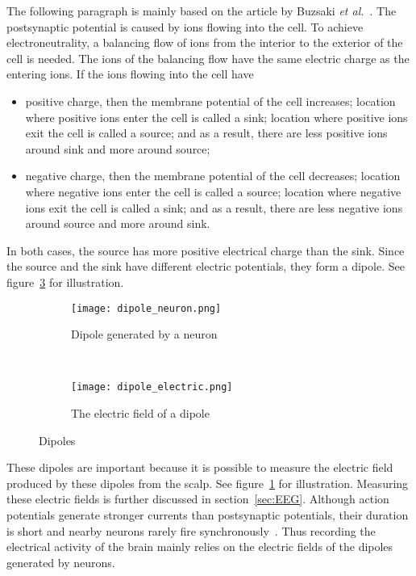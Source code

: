 The following paragraph is mainly based on the article by Buzsaki \textit{et al.}~\cite{electric_field}. The \gls{postsynaptic potential} is caused by ions flowing into the cell. To achieve electroneutrality, a balancing flow of ions from the interior to the exterior of the cell is needed. The ions of the balancing flow have the same electric charge as the entering ions. If the ions flowing into the cell have
\begin{itemize}
	\item positive charge, then 
	\subitem the \gls{membrane potential} of the cell increases;
	\subitem location where positive ions enter the cell is called a \gls{sink};
	\subitem location where positive ions exit the cell is called a \gls{source}; and
	\subitem as a result, there are less positive ions around \gls{sink} and more around \gls{source};
	\item negative charge, then
	\subitem the \gls{membrane potential} of the cell decreases;
	\subitem location where negative ions enter the cell is called a \gls{source};
	\subitem location where negative ions exit the cell is called a \gls{sink}; and
	\subitem as a result, there are less negative ions around \gls{source} and more around \gls{sink}.
\end{itemize}

In both cases, the \gls{source} has more positive electrical charge than the \gls{sink}. Since the \gls{source} and the \gls{sink} have different electric potentials, they form a \gls{dipole}. See figure~\ref{fig:dipole} for illustration.

\begin{figure}[h!]
	\centering
	\begin{subfigure}{0.48\textwidth}
		\texttt{[image: dipole\_neuron.png]}
		\caption{Dipole generated by a neuron~\cite[p.~669]{neuroscience}}
		\label{fig:dipole_neuron}
	\end{subfigure}
	~
	\begin{subfigure}{0.48\textwidth}
		\texttt{[image: dipole\_electric.png]}
		\caption{The electric field of a dipole\protect\footnotemark}
		\label{fig:dipole_electric}
	\end{subfigure}
	\caption{Dipoles}
	\label{fig:dipole}
\end{figure}

These \glspl{dipole} are important because it is possible to measure the electric field produced by these \glspl{dipole} from the scalp. See figure~\ref{fig:dipole_neuron} for illustration. Measuring these electric fields is further discussed in section~\ref{sec:EEG}. Although \glspl{action potential} generate stronger currents than \glspl{postsynaptic potential}, their duration is short and nearby \glspl{neuron} rarely fire synchronously~\cite{electric_field}. Thus recording the electrical activity of the brain mainly relies on the electric fields of the \glspl{dipole} generated by \glspl{neuron}.

